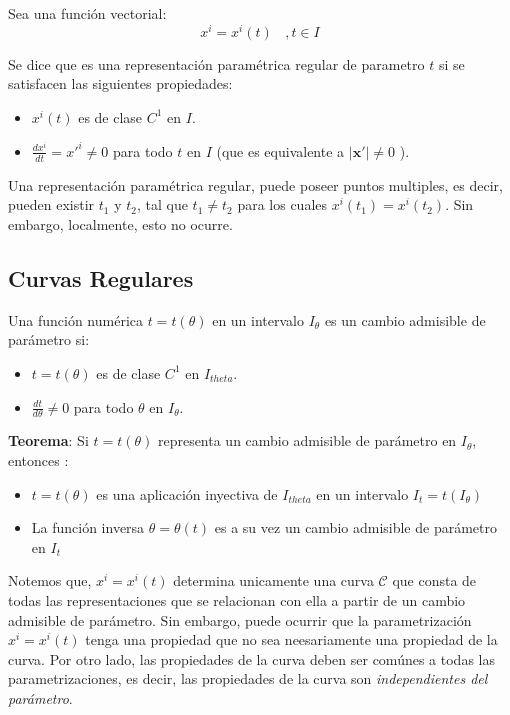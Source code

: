 \documentclass[letterpaper,11pt,twoside]{report}
\begin{document}
Sea una funci\'on vectorial: 
	\begin{equation*}
		x^{i} = x^{i}(t) \ \ \ \ , t \in I  
	\end{equation*}

Se dice que es una representaci\'on param\'etrica regular de parametro $t$ si se satisfacen las siguientes propiedades:
	\begin{itemize}
		\item	$x^{i}(t)$ es de clase $C^{1}$ en $I$.
		\item	$\frac{dx^{i}}{dt} = x'^{i} \neq 0$ para todo $t$ en $I$ (que es equivalente a $ \left| \textbf{x}'\right| \neq 0$ ).
	\end{itemize}

Una representaci\'on param\'etrica regular, puede poseer puntos multiples, es decir, pueden existir $t_{1}$ y $t_{2}$, 
tal que $t_{1} \neq t_{2}$ para los cuales $x^{i}(t_{1}) = x^{i}(t_{2})$. Sin embargo, localmente, esto no ocurre.

\subsection{Curvas Regulares}

Una funci\'on num\'erica $t = t(\theta)$ en un intervalo $I_{\theta}$ es un cambio admisible de par\'ametro si:
	\begin{itemize}
		\item	$t = t(\theta)$ es de clase $C^{1}$ en $I_{theta}$.
		\item	$\frac{dt}{d\theta} \neq 0$ para todo $\theta$ en $I_{\theta}$.
	\end{itemize}

\textbf{Teorema}: Si $t = t(\theta)$ representa un cambio admisible de par\'ametro en $I_{\theta}$, entonces :
	\begin{itemize}
		\item	$t = t(\theta)$ es una aplicaci\'on inyectiva de $I_{theta}$ en un intervalo $I_{t} = t(I_{\theta})$
		\item	La funci\'on inversa $\theta = \theta(t)$ es a su vez un cambio admisible de par\'ametro en $I_{t}$
	\end{itemize}

Notemos que, $x^{i} = x^{i}(t)$ determina unicamente una curva $\mathcal{C}$ que consta de todas las representaciones que se 
relacionan con ella a partir de un cambio admisible de par\'ametro. Sin embargo, puede ocurrir que la parametrizaci\'on $x^{i} = x^{i}(t)$  
tenga una propiedad que no sea neesariamente una propiedad de la curva. Por otro lado, las propiedades de la curva deben ser com\'unes a 
todas las parametrizaciones, es decir, las propiedades de la curva son \textit{independientes del par\'ametro}. \\
\end{document}
